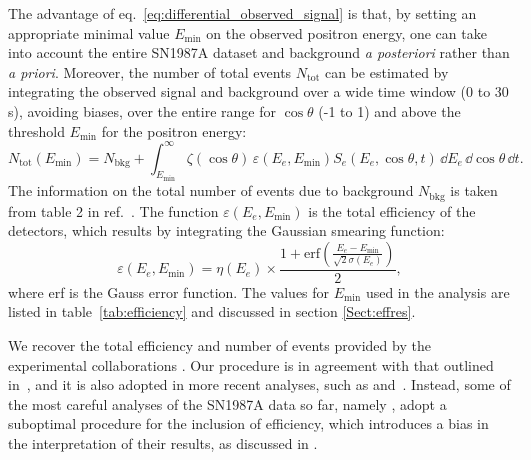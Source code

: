 \documentclass[a4paper,11pt]{article}
\begin{document}
The advantage of eq.~\eqref{eq:differential_observed_signal} is that, by setting an appropriate minimal value 
$E_{\min}$ on the observed positron   energy, one can take into account the entire SN1987A dataset and background {\em a posteriori} rather than {\em a priori}. 
 Moreover, the number of total events $N_{\text{tot}}$ can be estimated by integrating the observed signal and background over a wide time window (0 to 30 s), avoiding biases,
 over the entire range for $\cos \theta$ (-1 to 1) and  above the threshold  $E_{\min}$ for the positron energy:
\begin{equation}
    N_{\text{tot}}(E_{\min})=N_{\text{bkg}}+\int_{E_{\min}}^{\infty}\zeta(\cos{\theta})\,\varepsilon(E_e, E_{\min})S_e(E_e, \cos{\theta}, t)\,\dd E_e\,\dd\!\cos{\theta}\,\dd t .
\end{equation}
The information on the total number of events due to background $N_{\text{bkg}}$ is taken from table 2 in ref.~\cite{Vissani:2014doa}. The  function $\varepsilon(E_e, E_{\min})$ is  the total efficiency  of the detectors, which results by integrating  the Gaussian smearing function:
\begin{equation}\label{eq:epsilonexpression}
       \varepsilon(E_e, 
        E_{\min})=\eta(E_e)\times \frac{1+ \text{erf}\left(\frac{E_e-E_{\min}}{\sqrt{2}\sigma(E_e)}\right)}{2},
\end{equation}
where erf is the Gauss error function. The values for $E_{\min}$ used in the analysis are listed in table~\ref{tab:efficiency} and discussed in section \ref{Sect:effres}. 

%
We recover the total efficiency and number of events provided by the experimental collaborations \cite{hirataPhysRevLett.58.1490,PhysRevD.38.448,PhysRevLett.58.1494,PhysRevD.37.3361,ALEXEYEV1988209}.
%
Our procedure is in agreement  with that outlined in~\cite{Jegerlehner:1996kx}, and it is also  adopted in more recent analyses, such as \cite{Vissani:2014doa} and~\cite{DedinNeto:2023hhp}.
%
Instead, some of the  most careful  analyses of the SN1987A data so far, namely  \cite{Loredo:2001rx,Pagliaroli:2008ur}, adopt a suboptimal procedure for the inclusion of efficiency, which introduces a bias in the interpretation of their results, 
as discussed in \cite{Vissani:2014doa}.
\end{document}
